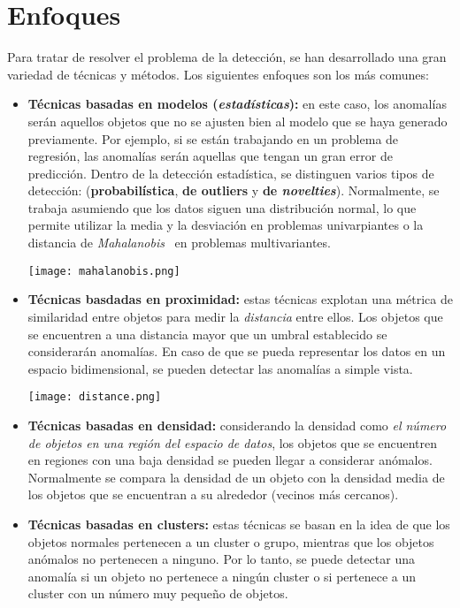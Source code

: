 \section{Enfoques}
Para tratar de resolver el problema de la detección, se han desarrollado una gran variedad de
técnicas y métodos. Los siguientes enfoques son los más comunes:
\begin{itemize}[topsep=0pt]
	\item \textbf{Técnicas basadas en modelos (\textit{estadísticas}):} en este caso, los anomalías serán
		aquellos objetos que no se ajusten bien al modelo que se haya generado previamente. Por ejemplo,
		si se están trabajando en un problema de regresión, las anomalías serán aquellas que tengan un
		gran error de predicción. Dentro de la detección estadística, se distinguen varios tipos de detección:
		(\textbf{probabilística}, \textbf{de outliers} y \textbf{de \textit{novelties}}). Normalmente, se
		trabaja asumiendo que los datos siguen una distribución normal, lo que permite utilizar la media y la
		desviación en problemas univarpiantes o la distancia de \emph{Mahalanobis}~\cite{mahalanobis2018generalized}
		en problemas multivariantes.

		\begin{minipage}{\linewidth}
			\centering
			\texttt{[image: mahalanobis.png]}
			\label{fig:fig2}
		\end{minipage}
	\item \textbf{Técnicas basdadas en proximidad:} estas técnicas explotan una métrica de
		similaridad entre objetos para medir la \textit{distancia} entre ellos. Los objetos que
		se encuentren a una distancia mayor que un umbral establecido se considerarán anomalías.
		En caso de que se pueda representar los datos en un espacio bidimensional, se pueden
		detectar las anomalías a simple vista.

		\begin{minipage}{\linewidth}
			\centering
			\texttt{[image: distance.png]}
			\label{fig:fig4}
		\end{minipage}
	\item \textbf{Técnicas basadas en densidad:} considerando la densidad como \emph{el número de
		objetos en una región del espacio de datos}, los objetos que se encuentren en regiones
		con una baja densidad se pueden llegar a considerar anómalos. Normalmente se compara la
		densidad de un objeto con la densidad media de los objetos que se encuentran a su alrededor
		(vecinos más cercanos).
	\item \textbf{Técnicas basadas en clusters:} estas técnicas se basan en la idea de que los
		objetos normales pertenecen a un cluster o grupo, mientras que los objetos anómalos no
		pertenecen a ninguno. Por lo tanto, se puede detectar una anomalía si un objeto no pertenece
		a ningún cluster o si pertenece a un cluster con un número muy pequeño de objetos.
		\vspace{1\baselineskip}


\end{itemize}
